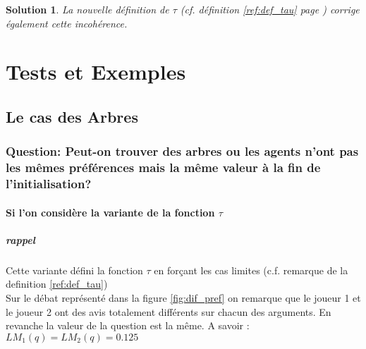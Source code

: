 \documentclass[12pt]{article}
\theoremstyle{defi}
\theoremstyle{not}
\theoremstyle{prob}
\newtheorem{solution}{Solution}[problem]
\begin{document}
\begin{solution}
    La nouvelle définition de $\tau$ (cf. définition \ref{ref:def_tau} page \pageref{ref:def_tau}) corrige également cette incohérence.
\end{solution}


\section{Tests et Exemples}

\subsection{Le cas des Arbres}
\subsubsection{Question: Peut-on trouver des arbres ou les agents n'ont pas les mêmes préférences mais la même valeur à la fin de l'initialisation?\newline}

\paragraph{Si l'on considère la variante de la fonction $\tau$}

\subparagraph{rappel} Cette variante défini la fonction $\tau$ en forçant les cas limites (c.f. remarque de la definition \ref{ref:def_tau}) \\

Sur le débat représenté dans la figure \ref{fig:dif_pref} on remarque que le joueur 1 et le joueur 2 ont des avis totalement différents sur chacun des arguments. En revanche la valeur de la question est la même. A savoir : $LM_1(q) = LM_2(q) = 0.125$
\end{document}
